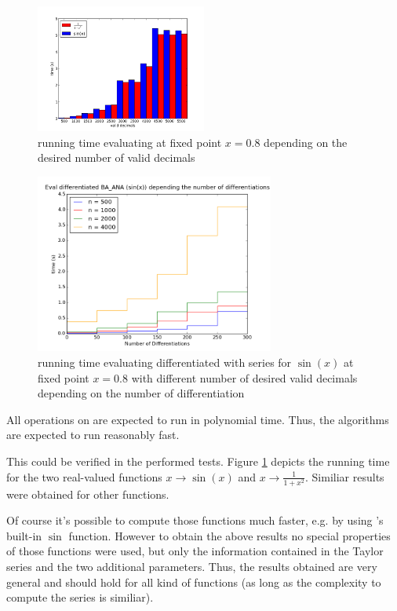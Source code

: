 			\begin{figure}[h]
				\centering
				\includegraphics[width=0.5\textwidth]{img/analytic/ba_ana_dep_on_n_bar.png}
				\caption{running time evaluating \baana at fixed point $x=0.8$ depending on the desired number of valid decimals}
				\label{fig:ba_ana dep on n}
			\end{figure}
			\begin{figure}[h]
				\centering
				\includegraphics[width=0.7\textwidth]{img/analytic/ba_ana_dep_on_diff_sin.png}
				\caption{running time evaluating differentiated \baana with series for $\sin(x)$ at fixed point $x=0.8$ with different number
        of desired valid decimals depending on the number of differentiation}
				\label{fig:ba_ana dep on differentiation}
			\end{figure}
      All operations on \baana are expected to run in polynomial time.
      Thus, the algorithms are expected to run reasonably fast.

      This could be verified in the performed tests. 
      Figure \ref{fig:ba_ana dep on n} depicts the running time for the two real-valued functions $x \to \sin(x)$ and $x \to \frac{1}{1+x^2}$.
      Similiar results were obtained for other functions.

      Of course it's possible to compute those functions much faster, e.g. by using {\irram}'s built-in $\sin$ function.
      However to obtain the above results no special properties of those functions were used, but only the information 
      contained in the Taylor series and the two additional parameters.
      Thus, the results obtained are very general and should hold for all kind of functions (as long as the complexity to compute
      the series is similiar).

